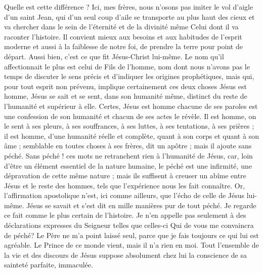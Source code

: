 Quelle est cette différence ? Ici, mes frères, nous n’osons pas imiter le vol d’aigle d’un saint Jean, qui d’un seul coup d’aile se transporte au plus haut des cieux et va chercher dans le sein de l’éternité et de la divinité même Celui dont il va raconter l’histoire.
Il convient mieux aux
besoins et aux habitudes de l’esprit moderne et aussi à la faiblesse de notre foi, de prendre la terre pour point de départ.
Aussi bien, c’est ce que fit Jésus-Christ lui-même.
Le nom qu’il affectionnait le plus est celui de Fils de l’homme, nom dont nous n’avons pas le temps de discuter le sens précis et d’indiquer les origines prophétiques, mais qui, pour tout esprit non prévenu, implique certainement ces deux choses\frcolon{} Jésus est homme, Jésus se sait et se sent, dans son humanité même, distinct du reste de l’humanité et supérieur à elle.
Certes, Jésus est homme\frcolon{} chacune de ses paroles est une confession de son humanité et chacun de ses actes le révèle. Il est homme, on le sent à ses pleurs, à ses souffrances, à ses luttes, à ses tentations, à ses prières ; il est homme, d’une humanité réelle et complète, quant à son corps et quant à son âme ; \Og{} semblable en toutes choses à ses frères\Fg{}, dit un apôtre ; mais il ajoute\frcolon{} \Og{} sans péché\Fg{}.
Sans péché ! ces mots ne retranchent rien à l’humanité de Jésus, car, loin d’être un élément essentiel de la nature humaine, le péché est une infirmité, une dépravation de cette même nature ; mais ils suffisent à creuser un abîme entre Jésus et le reste des hommes, tels que l’expérience nous les fait connaître. Or, l’affirmation apostolique n’est, ici comme ailleurs, que l’écho de celle de Jésus lui-même.
Jésus se savait et s’est dit en mille manières pur de tout péché.
Je regarde ce fait comme le plus certain de l’histoire.
Je n’en appelle pas seulement à des déclarations expresses du Seigneur telles que celles-ci\frcolon{} \Og{} Qui de vous me convaincra de péché? \ocadr{} Le Père ne m’a point laissé seul, parce que je fais toujours ce qui lui est agréable. \ocadr{} Le Prince de ce monde vient, mais il n’a rien en moi.\Fg{}
Tout l’ensemble de la vie et des discours de Jésus suppose absolument chez lui la conscience de sa sainteté parfaite, immaculée.

